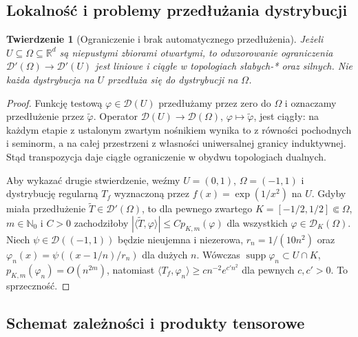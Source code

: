 \documentclass[11pt,a4paper]{article}
\numberwithin{equation}{section}
\theoremstyle{plain}
\newtheorem{twierdzenie}{Twierdzenie}[section]
\theoremstyle{definition}
\theoremstyle{remark}
\newcommand{\R}{\mathbb R}
\newcommand{\N}{\mathbb N}
\DeclareMathOperator{\supp}{supp}
\begin{document}
\subsection{Lokalność i problemy przedłużania dystrybucji}

\begin{twierdzenie}[Ograniczenie i brak automatycznego przedłużenia]
\label{thm:restriction25}
Jeżeli $U\subseteq\Omega\subseteq\R^d$ są niepustymi
zbiorami otwartymi, to odwzorowanie ograniczenia
$\mathcal D'(\Omega)\to\mathcal D'(U)$ jest liniowe
i ciągłe w topologiach słabych-* oraz silnych.
Nie każda dystrybucja na $U$ przedłuża się do
dystrybucji na $\Omega$.
\end{twierdzenie}
\begin{proof}
Funkcję testową $\varphi\in\mathcal D(U)$ przedłużamy
przez zero do $\Omega$ i oznaczamy przedłużenie przez
$\widetilde\varphi$. Operator
$\mathcal D(U)\to\mathcal D(\Omega)$,
$\varphi\mapsto\widetilde\varphi$, jest ciągły: na każdym
etapie z ustalonym zwartym nośnikiem wynika to z równości
pochodnych i seminorm, a na całej przestrzeni z własności
uniwersalnej granicy induktywnej. Stąd transpozycja
daje ciągłe ograniczenie w obydwu topologiach dualnych.

Aby wykazać drugie stwierdzenie, weźmy
$U=(0,1)$, $\Omega=(-1,1)$ i dystrybucję regularną
$T_f$ wyznaczoną przez $f(x)=\exp(1/x^2)$ na $U$.
Gdyby miała przedłużenie $\widetilde T\in\mathcal D'(\Omega)$,
to dla pewnego zwartego $K=[-1/2,1/2]\Subset\Omega$,
$m\in\N_0$ i $C>0$ zachodziłoby
$|\langle\widetilde T,\varphi\rangle|\le C p_{K,m}(\varphi)$
dla wszystkich $\varphi\in\mathcal D_K(\Omega)$.
Niech $\psi\in\mathcal D((-1,1))$ będzie nieujemna i niezerowa,
$r_n=1/(10n^2)$ oraz
$\varphi_n(x)=\psi((x-1/n)/r_n)$ dla dużych $n$.
Wówczas $\supp\varphi_n\subset U\cap K$,
$p_{K,m}(\varphi_n)=O(n^{2m})$, natomiast
$\langle T_f,\varphi_n\rangle\ge c n^{-2}e^{c'n^2}$
dla pewnych $c,c'>0$. To sprzeczność.
\end{proof}

\subsection{Schemat zależności i produkty tensorowe}
\end{document}
